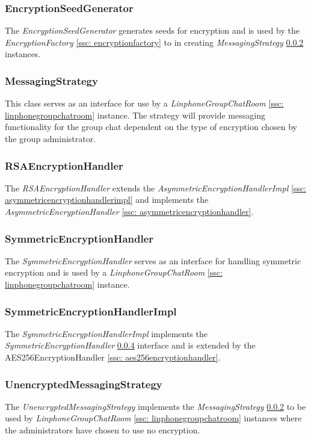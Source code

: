 \documentclass[11pt]{article}
\begin{document}
\subsubsection{EncryptionSeedGenerator}\label{ssc: encryptionseedgenerator}
The \textit{EncryptionSeedGenerator} generates seeds for encryption and is used by the \textit{EncryptionFactory} \ref{ssc: encryptionfactory} to in creating \textit{MessagingStrategy} \ref{ssc: messagingstrategy} instances.
\subsubsection{MessagingStrategy}\label{ssc: messagingstrategy}
This class serves as an interface for use by a \textit{LinphoneGroupChatRoom} \ref{ssc: linphonegroupchatroom}  instance. The strategy will provide messaging functionality for the group chat dependent on the type of encryption chosen by the group administrator.
\subsubsection{RSAEncryptionHandler}\label{ssc: rsaencryptionhandler}
The \textit{RSAEncryptionHandler} extends the \textit{AsymmetricEncryptionHandlerImpl} \ref{ssc: asymmetricencryptionhandlerimpl}  and implements the \textit{AsymmetricEncryptionHandler} \ref{ssc: asymmetricencryptionhandler}.
\subsubsection{SymmetricEncryptionHandler}\label{ssc: symmetricencryptionhandler}
The \textit{SymmetricEncryptionHandler} serves as an interface for handling symmetric encryption and is used by a \textit{LinphoneGroupChatRoom} \ref{ssc: linphonegroupchatroom} instance.
\subsubsection{SymmetricEncryptionHandlerImpl}\label{ssc: symmetricencryptionhandlerimpl}
The \textit{SymmetricEncryptionHandlerImpl} implements the \textit{SymmetricEncryptionHandler} \ref{ssc: symmetricencryptionhandler} interface and is extended by the AES256EncryptionHandler \ref{ssc: aes256encryptionhandler}.
\subsubsection{UnencryptedMessagingStrategy}\label{unencryptedmessaginstrategy}
The \textit{UnencryptedMessagingStrategy} implements the \textit{MessagingStrategy} \ref{ssc: messagingstrategy} to be used by \textit{LinphoneGroupChatRoom} \ref{ssc: linphonegroupchatroom} instances where the administrators have chosen to use no encryption.
\end{document}
